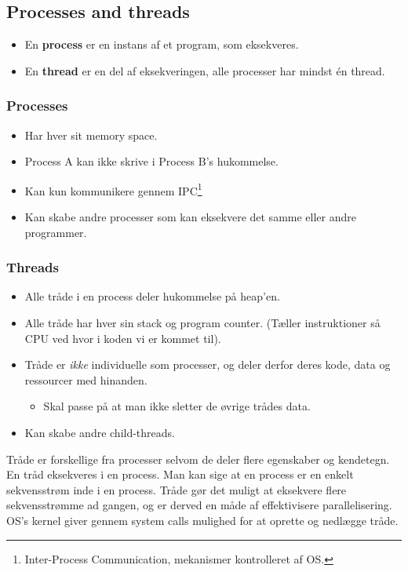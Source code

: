 \newpage

\subsection{Processes and threads}
\begin{itemize}
	\item En \textbf{process} er en instans af et program, som eksekveres.
	\item En \textbf{thread} er en del af eksekveringen, alle processer har mindst én thread.
\end{itemize}

\subsubsection*{Processes}
\begin{itemize}
	\item Har hver sit memory space.
	\item Process A kan ikke skrive i Process B's hukommelse.
	\item Kan kun kommunikere gennem IPC\footnote{Inter-Process Communication, mekanismer kontrolleret af OS.}
	\item Kan skabe andre processer som kan eksekvere det samme eller andre programmer.
\end{itemize}

\subsubsection{Threads}
\begin{itemize}
	\item Alle tråde i en process deler hukommelse på heap'en.
	\item Alle tråde har hver sin stack og program counter. (Tæller instruktioner så CPU ved hvor i koden vi er kommet til).
	\item Tråde er \textit{ikke} individuelle som processer, og deler derfor deres kode, data og ressourcer med hinanden.
	\begin{itemize}
		\item Skal passe på at man ikke sletter de øvrige trådes data.
	\end{itemize}
	\item Kan skabe andre child-threads.
\end{itemize}

Tråde er forskellige fra processer selvom de deler flere egenskaber og kendetegn. En tråd eksekveres i en process. Man kan sige at en process er en enkelt sekvensstrøm inde i en process.
Tråde gør det muligt at eksekvere flere sekvensstrømme ad gangen, og er derved en måde af effektivisere parallelisering. OS's kernel giver gennem system calls mulighed for at oprette og nedlægge tråde.

